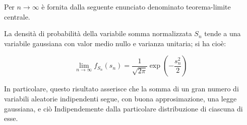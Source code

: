 Per $n \to \infty$ è fornita dalla seguente enunciato denominato teorema-limite centrale. \newline

La densità di probabilità della variabile somma normalizzata $S_n$ tende a una variabile gaussiana con valor medio nullo e varianza unitaria; si ha cioè: 

{
    \Large 
    \begin{equation}
        \lim_{n \to \infty} f_{S_n} (s_n) 
        = 
        \frac{1}{\sqrt{2 \pi}} 
        \exp(-\frac{s_n ^{2}}{2})
    \end{equation}
}

In particolare, questo risultato asserisce che la somma di un gran numero di variabili aleatorie indipendenti segue, 
con buona approsimazione, una legge gaussiana, e ciò Indipendemente dalla particolare distribuzione di ciascuna di esse. \newline 

\newpage 


